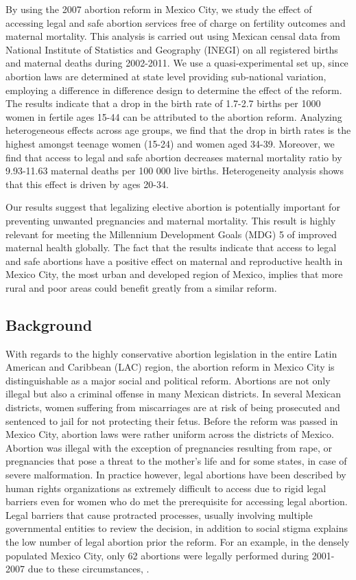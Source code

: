 \documentclass[a4paper, 11pt]{article}
\begin{document}
\begin{spacing}{1.5}
\begin{multicols}{2}
 By using the 2007 abortion reform in Mexico City, we study the effect of accessing legal and safe abortion services free of charge on fertility outcomes and maternal mortality. This analysis is carried out using Mexican censal data from National Institute of Statistics and Geography (INEGI) on all registered births and maternal deaths during 2002-2011. We use a quasi-experimental set up, since abortion laws are determined at state level providing sub-national variation, employing a difference in difference design to determine the effect of the reform. The results indicate that a drop in the birth rate of 1.7-2.7 births per 1000 women in fertile ages 15-44 can be attributed to the abortion reform. Analyzing heterogeneous effects across age groups, we find that the drop in birth rates is the highest amongst teenage women (15-24) and women aged 34-39. Moreover, we find that access to legal and safe abortion decreases maternal mortality ratio by 9.93-11.63 maternal deaths per 100 000 live births. Heterogeneity analysis shows that this effect is driven by ages 20-34. 
 
 Our results suggest that legalizing elective abortion is potentially important for preventing unwanted pregnancies and maternal mortality. This result is highly relevant for meeting the Millennium Development Goals (MDG) 5 of improved maternal health globally. The fact that the results indicate that access to legal and safe abortions have a positive effect on maternal and reproductive health in Mexico City, the most urban and developed region of Mexico, implies that more rural and poor areas could benefit greatly from a similar reform.        
 \subsection{Background}
 With regards to the highly conservative abortion legislation in the entire Latin American and Caribbean (LAC) region, the abortion reform in Mexico City is distinguishable as a major social and political reform. Abortions are not only illegal but also a criminal offense in many Mexican districts. In several Mexican districts, women suffering from miscarriages are at risk of being prosecuted and sentenced to jail for not protecting their fetus. Before the reform was passed in Mexico City, abortion laws were rather uniform across the districts of Mexico.  Abortion was illegal with the exception of pregnancies resulting from rape, or pregnancies that pose a threat to the mother's life and for some states, in case of severe malformation. In practice however, legal abortions have been described by human rights organizations as extremely difficult to access due to rigid legal barriers even for women who do met the prerequisite for accessing legal abortion. Legal barriers that cause protracted processes, usually involving multiple governmental entities to review the decision, in addition to social stigma explains the low number of legal abortion prior the reform. For an example, in the densely populated Mexico City, only 62 abortions were legally performed during 2001-2007 due to these circumstances,  \cite{Becker,Madrazo2009,Levinetal2009,Schiavonetal2010,JuarezSingh2012}. 
 

\end{multicols}
\end{spacing}
\end{document}
